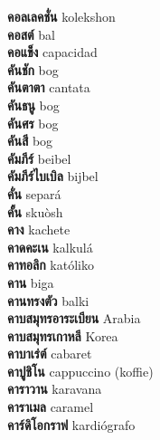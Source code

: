 \textbf{ คอลเลคชั่น  } kolekshon \\
\textbf{ คอสต์  } bal \\
\textbf{ คอแข็ง  } capacidad \\
\textbf{ คันชัก  } bog \\
\textbf{ คันตาตา  } cantata \\
\textbf{ คันธนู  } bog \\
\textbf{ คันศร  } bog \\
\textbf{ คันสี  } bog \\
\textbf{ คัมภีร์  } beibel \\
\textbf{ คัมภีร์ไบเบิล  } bijbel \\
\textbf{ คั่น  } separá \\
\textbf{ คั้น  } skuòsh \\
\textbf{ คาง  } kachete \\
\textbf{ คาดคะเน  } kalkulá \\
\textbf{ คาทอลิก  } katóliko \\
\textbf{ คาน  } biga \\
\textbf{ คานทรงตัว  } balki \\
\textbf{ คาบสมุทรอาระเบียน  } Arabia \\
\textbf{ คาบสมุทรเกาหลี  } Korea \\
\textbf{ คาบาเร่ต์  } cabaret \\
\textbf{ คาปูชิโน  } cappuccino (koffie) \\
\textbf{ คาราวาน  } karavana \\
\textbf{ คาราเมล  } caramel \\
\textbf{ คาร์ดิโอกราฟ  } kardiógrafo \\
